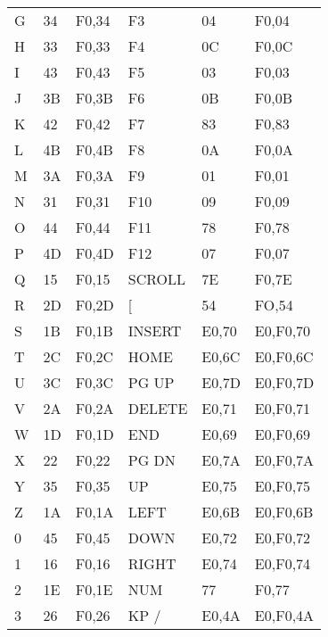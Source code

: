\begin{center}
  \begin{tabular}{ | l | l | l | l | l | l | }
    \hline
	    \kword{KEY} & \kword{MAKE} & \kword{BREAK} & \kword{KEY} & \kword{MAKE} & \kword{BREAK} \\ \hline
	    G & 34 & F0,34 & F3 & 04 & F0,04           \\ \hline
	    H & 33 & F0,33 & F4 & 0C & F0,0C           \\ \hline	    
	    I & 43 & F0,43 & F5 & 03 & F0,03           \\ \hline
	    J & 3B & F0,3B & F6 & 0B & F0,0B           \\ \hline
	    K & 42 & F0,42 & F7 & 83 & F0,83           \\ \hline
	    L & 4B & F0,4B & F8 & 0A & F0,0A           \\ \hline
	    M & 3A & F0,3A & F9 & 01 & F0,01           \\ \hline
	    N & 31 & F0,31 & F10 & 09 & F0,09          \\ \hline
	    O & 44 & F0,44 & F11 & 78 & F0,78          \\ \hline
	    P & 4D & F0,4D & F12 & 07 & F0,07          \\ \hline
	    Q & 15 & F0,15 & SCROLL & 7E & F0,7E       \\ \hline
	    R & 2D & F0,2D & [ & 54 & FO,54            \\ \hline
	    S & 1B & F0,1B & INSERT & E0,70 & E0,F0,70 \\ \hline
	    T & 2C & F0,2C & HOME & E0,6C & E0,F0,6C   \\ \hline
	    U & 3C & F0,3C & PG UP & E0,7D & E0,F0,7D  \\ \hline
	    V & 2A & F0,2A & DELETE & E0,71 & E0,F0,71 \\ \hline
	    W & 1D & F0,1D & END & E0,69 & E0,F0,69    \\ \hline
	    X & 22 & F0,22 & PG DN & E0,7A & E0,F0,7A  \\ \hline
	    Y & 35 & F0,35 & UP & E0,75 & E0,F0,75     \\ \hline
	    Z & 1A & F0,1A & LEFT & E0,6B & E0,F0,6B   \\ \hline
	    0 & 45 & F0,45 & DOWN &  E0,72 & E0,F0,72  \\ \hline
	    1 & 16 & F0,16 & RIGHT &  E0,74 & E0,F0,74 \\ \hline
	    2 & 1E & F0,1E & NUM & 77 & F0,77          \\ \hline
	    3 & 26 & F0,26 & KP / & E0,4A & E0,F0,4A   \\ \hline

\end{tabular}
\end{center}
